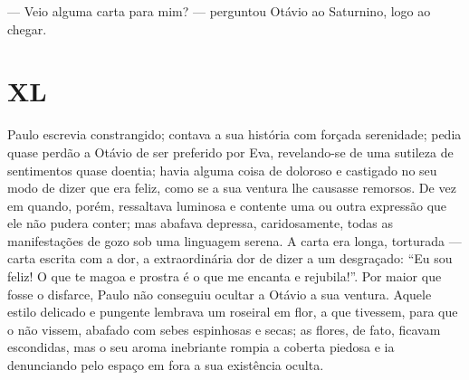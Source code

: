 {--- Veio alguma carta para mim? --- perguntou
Otávio ao Saturnino, logo ao chegar.



\section{XL}






Paulo escrevia constrangido; contava a sua história com
forçada serenidade; pedia quase perdão a Otávio de ser
preferido por Eva, revelando-se de uma sutileza de sentimentos
quase doentia; havia alguma coisa de doloroso e castigado no seu
modo de dizer que era feliz, como se a sua ventura lhe causasse
remorsos. De vez em quando, porém, ressaltava luminosa e contente uma ou
outra expressão que ele não pudera conter; mas abafava depressa,
caridosamente, todas as manifestações de gozo sob uma linguagem serena.
A carta era longa, torturada --- carta escrita com a dor, a
extraordinária dor de dizer a um desgraçado: ``Eu sou feliz! O que te
magoa e prostra é o que me encanta e rejubila!''. Por maior que fosse o
disfarce, Paulo não conseguiu ocultar a Otávio a sua ventura.
Aquele estilo delicado e pungente lembrava um roseiral em flor, a que
tivessem, para que o não vissem, abafado com sebes espinhosas e secas;
as flores, de fato, ficavam escondidas, mas o seu aroma inebriante
rompia a coberta piedosa e ia denunciando pelo espaço em fora a sua
existência oculta.

}
